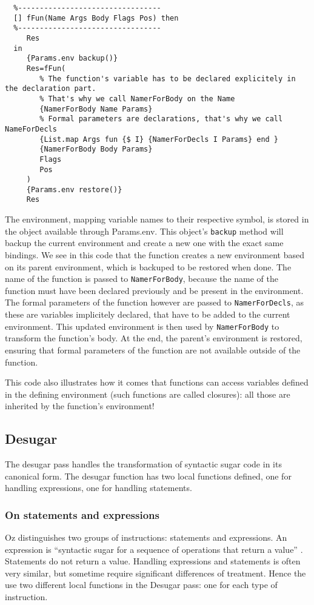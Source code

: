 \documentclass[a4paper]{memoir}
\begin{document}
\begin{lstlisting}
  %---------------------------------
  [] fFun(Name Args Body Flags Pos) then
  %---------------------------------
     Res
  in
     {Params.env backup()} 
     Res=fFun(
        % The function's variable has to be declared explicitely in the declaration part.
        % That's why we call NamerForBody on the Name
        {NamerForBody Name Params}
        % Formal parameters are declarations, that's why we call NameForDecls
        {List.map Args fun {$ I} {NamerForDecls I Params} end }
        {NamerForBody Body Params}
        Flags
        Pos
     )
     {Params.env restore()}
     Res
\end{lstlisting}
The environment, mapping variable names to their respective symbol, is stored in the object available through Params.env. This object's \lstinline!backup! method will backup the current environment and create a new one with the exact same bindings.
We see in this code that the function creates a new environment based on its parent environment, which is backuped to be restored when done. The name of the function is passed to \lstinline!NamerForBody!, because the name of the function must have been declared previously and be present in the environment. 
The formal parameters of the function however are passed to \lstinline!NamerForDecls!, as these are variables implicitely declared, that have to be added to the current environment. This updated environment is then used by \lstinline!NamerForBody! to transform the function's body.
At the end, the parent's environment is restored, ensuring that formal parameters of the function are not available outside of the function.

This code also illustrates how it comes that functions can access variables defined in the defining environment (such functions are called closures): all those are inherited by the function's environment!




\subsection{Desugar}\label{sec:arch:desugar}
The desugar pass handles the transformation of syntactic sugar code in its canonical form.
The desugar function has two local functions defined, one for handling expressions, one for handling statements.
\subsubsection{On statements and expressions}
Oz distinguishes two groups of instructions: statements and expressions. An expression is ``syntactic sugar for a sequence of operations that return a value'' . Statements do not return a value.
Handling expressions and statements is often very similar, but sometime require significant differences of treatment. Hence the use two different local functions in the Desugar pass: one for each type of instruction.
\end{document}
